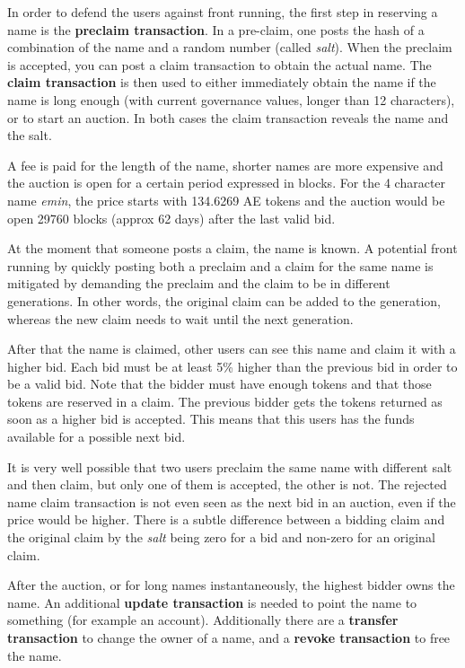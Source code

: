 In order to defend the users against front running, the first step in
reserving a name is the \textbf{preclaim transaction}. In a pre-claim,
one posts the hash of a combination of the name and a random number
(called \textit{salt}). When the preclaim is accepted, you can
post a claim transaction to obtain the actual name.
The \textbf{claim transaction} is
then used to either immediately obtain the name if the name is long
enough (with current governance values, longer than 12 characters), or to start an
auction. In both cases the
claim transaction reveals the name and the salt.

A fee is paid for the
length of the name, shorter names are more expensive and the auction
is open for a certain period expressed in blocks. For the 4 character
name \textit{emin}, the price starts with 134.6269 AE tokens and the
auction would be open 29760 blocks (approx 62 days) after the last valid bid.

At the moment that someone posts a claim,  the name is known. A potential
front running by quickly posting both a preclaim and a claim for the
same name is mitigated by demanding the preclaim and the claim to be
in different generations. In other words, the original claim can be
added to the generation, whereas the new claim needs to wait until the
next generation.

After that the name is claimed, other users can see this name and
claim it with a higher bid. Each bid must be at least 5\% higher than
the previous bid in order to be a valid bid. Note that the bidder must
have enough tokens and that those tokens are reserved in a claim. The
previous bidder gets the tokens returned as soon as a higher bid is
accepted. This means that this users has the funds available for a
possible next bid.

It is very well possible that two users preclaim the same name with
different salt and then claim, but only one of them is accepted, the
other is not. The rejected name claim transaction is not even seen as
the next bid in an auction, even if the price would be higher. There
is a subtle difference between a bidding claim and the original claim
by the \textit{salt} being zero for a bid and non-zero for an original claim.

After the auction, or for long names instantaneously, the highest
bidder owns the name. An additional
\textbf{update transaction} is needed to point the name to something (for example an
account). Additionally there are a \textbf{transfer transaction} to
change the owner of a name, and a \textbf{revoke transaction} to free the
name.

